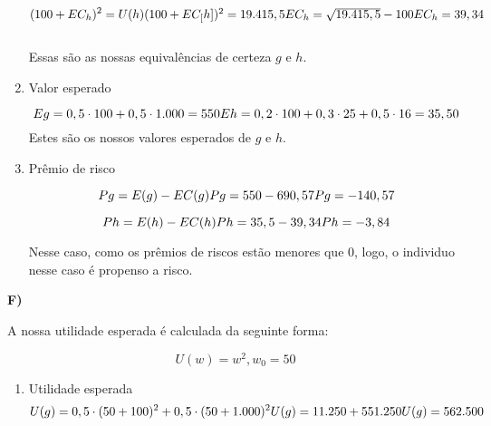 \begin{flushleft}
\begin{enumerate}
	\begin{equation}
	(100 + EC_{h})^{2} = U(h)
	$$\\$$
	(100 + EC_[h])^{2} = 19.415,5
	$$\\$$
	EC_{h} = \sqrt{19.415,5} - 100
	$$\\$$
	EC_{h} = 39,34
	\end{equation}
	\\ Essas são as nossas equivalências de certeza $g$ e $h$.
	
	\item Valor esperado
	
	\begin{equation}
	Eg = 0,5 \cdot 100 + 0,5 \cdot 1.000 = 550
	$$\\$$
	Eh = 0,2 \cdot 100 + 0,3 \cdot 25 + 0,5 \cdot 16 = 35,50
	\end{equation}
	Estes são os nossos valores esperados de $g$ e $h$.
	
	\item Prêmio de risco
	
	\begin{equation}
	Pg = E(g) - EC(g)
	$$\\$$
	Pg = 550 - 690,57
	$$\\$$
	Pg = -140,57
	\end{equation}
	
	\begin{equation}
	Ph = E(h) - EC(h)
	$$\\$$
	Ph = 35,5 - 39,34
	$$\\$$
	Ph = -3,84
	\end{equation}
	
	Nesse caso, como os prêmios de riscos estão menores que 0, logo, o individuo nesse caso é propenso a risco.
\end{enumerate}

\textbf{F)}

A nossa utilidade esperada é calculada da seguinte forma:

\begin{equation}
U(w) = w^{2} ,   w_{0} = 50
\end{equation}

\begin{enumerate}
	\item Utilidade esperada
	\begin{equation}
	U(g) = 0,5 \cdot (50 + 100)^{2} + 0,5 \cdot(50 + 1.000)^{2}
	$$\\$$
	U(g) = 11.250 + 551.250
	$$\\$$
	U(g) = 562.500
	\end{equation}
	

\end{enumerate}
\end{flushleft}
